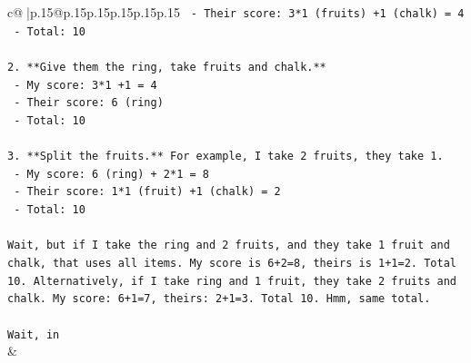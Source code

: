 \documentclass{article}
\begin{document}
{\begin{supertabular}{c@{$\;$}|p{.15\linewidth}@{}p{.15\linewidth}p{.15\linewidth}p{.15\linewidth}p{.15\linewidth}p{.15\linewidth}}
{{{\texttt{   {-} Their score: 3*1 (fruits) +1 (chalk) = 4} \\
\texttt{   {-} Total: 10} \\
\\ 
\texttt{2. **Give them the ring, take fruits and chalk.**} \\
\texttt{   {-} My score: 3*1 +1 = 4} \\
\texttt{   {-} Their score: 6 (ring)} \\
\texttt{   {-} Total: 10} \\
\\ 
\texttt{3. **Split the fruits.** For example, I take 2 fruits, they take 1.} \\
\texttt{   {-} My score: 6 (ring) + 2*1 = 8} \\
\texttt{   {-} Their score: 1*1 (fruit) +1 (chalk) = 2} \\
\texttt{   {-} Total: 10} \\
\\ 
\texttt{Wait, but if I take the ring and 2 fruits, and they take 1 fruit and chalk, that uses all items. My score is 6+2=8, theirs is 1+1=2. Total 10. Alternatively, if I take ring and 1 fruit, they take 2 fruits and chalk. My score: 6+1=7, theirs: 2+1=3. Total 10. Hmm, same total.} \\
\\ 
\texttt{Wait, in} \\
            }
        }
    }
    & \\ \\


\end{supertabular}}
\end{document}
